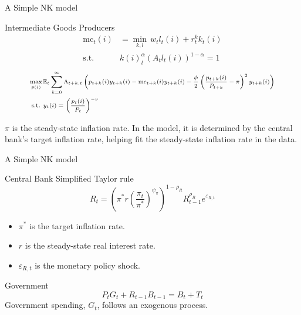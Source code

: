 \begin{frame}{A Simple NK model}
    \begin{block}{Intermediate Goods Producers}
        \begin{equation}
            \begin{aligned}
                \mathrm{mc}_t(i) &= \min\limits_{k, l} \,  w_t l_t(i) + r^k_t k_t(i)\\
                \text{s.t. }& k(i)_t^\alpha \left(A_t l_t(i)\right)^{1 - \alpha} = 1
            \end{aligned}
        \end{equation}
        \begin{equation}
            \scriptsize
            \begin{aligned}
                \max\limits_{p(i)}\, & \mathbb{E}_t \sum_{k=0}^{\infty} \Lambda_{t+k, t} \left(p_{t+k}(i)y_{t+k}(i) - \mathrm{mc}_{t+k}(i) y_{t+k}(i) - \frac{\phi}{2}\left(\frac{p_{t+k}(i)}{P_{t+k}} - \pi\right)^2 y_{t+k}(i)\right)\\
                \text{s.t. }& y_t(i) = \left(\frac{p_t(i)}{P_t}\right)^{-\nu}
            \end{aligned}
        \end{equation}

        $\pi$ is the steady-state inflation rate. In the model, it is determined by the central bank's target inflation rate, helping fit the steady-state inflation rate in the data.
    \end{block}
\end{frame}

\begin{frame}{A Simple NK model}
    \begin{block}{Central Bank}
        Simplified Taylor rule
        \begin{equation}
            R_t = \left(\pi^* r \left(\frac{\pi_t}{\pi^*}\right)^{\psi_{\pi}} \right)^{1 - \rho_R} R_{t-1}^{\rho_R}e^{\varepsilon_{R,t}}
        \end{equation}
        \begin{itemize}
            \item $\pi^*$ is the target inflation rate.
            \item $r$ is the steady-state real interest rate.
            \item $\varepsilon_{R,t}$ is the monetary policy shock.
        \end{itemize}
    \end{block}
    
    \begin{block}{Government}
        \begin{equation}
            P_t G_t + R_{t-1} B_{t-1} = B_t + T_t
        \end{equation}
        Government spending, $G_t$, follows an exogenous process.
    \end{block}
\end{frame}

